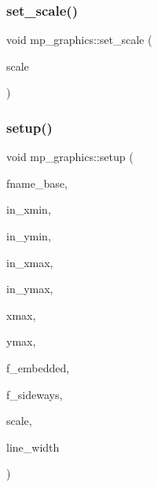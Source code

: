 \mbox{\label{classmp__graphics_a432c2c061c21c23230a57511e5f8dac4}} 
\subsubsection{\texorpdfstring{set\+\_\+scale()}{set\_scale()}}
{\footnotesize\ttfamily void mp\+\_\+graphics\+::set\+\_\+scale (\begin{DoxyParamCaption}\item[{double}]{scale }\end{DoxyParamCaption})}

\mbox{\label{classmp__graphics_a5b81adfb712dfb64b123db4ae72fadf2}} 
\subsubsection{\texorpdfstring{setup()}{setup()}}
{\footnotesize\ttfamily void mp\+\_\+graphics\+::setup (\begin{DoxyParamCaption}\item[{const char $\ast$}]{fname\+\_\+base,  }\item[{\mbox{\hyperlink{galois_8h_a09fddde158a3a20bd2dcadb609de11dc}{I\+NT}}}]{in\+\_\+xmin,  }\item[{\mbox{\hyperlink{galois_8h_a09fddde158a3a20bd2dcadb609de11dc}{I\+NT}}}]{in\+\_\+ymin,  }\item[{\mbox{\hyperlink{galois_8h_a09fddde158a3a20bd2dcadb609de11dc}{I\+NT}}}]{in\+\_\+xmax,  }\item[{\mbox{\hyperlink{galois_8h_a09fddde158a3a20bd2dcadb609de11dc}{I\+NT}}}]{in\+\_\+ymax,  }\item[{\mbox{\hyperlink{galois_8h_a09fddde158a3a20bd2dcadb609de11dc}{I\+NT}}}]{xmax,  }\item[{\mbox{\hyperlink{galois_8h_a09fddde158a3a20bd2dcadb609de11dc}{I\+NT}}}]{ymax,  }\item[{\mbox{\hyperlink{galois_8h_a09fddde158a3a20bd2dcadb609de11dc}{I\+NT}}}]{f\+\_\+embedded,  }\item[{\mbox{\hyperlink{galois_8h_a09fddde158a3a20bd2dcadb609de11dc}{I\+NT}}}]{f\+\_\+sideways,  }\item[{double}]{scale,  }\item[{double}]{line\+\_\+width }\end{DoxyParamCaption})}

